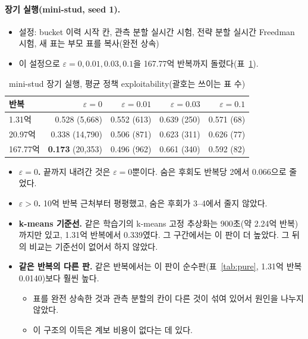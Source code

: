 \paragraph{장기 실행(mini-stud, seed 1).}
\begin{itemize}
  \item 설정: bucket 이력 시작 칸, 관측 분할 실시간 시험, 전략 분할 실시간 Freedman 시험, 새 표는 부모 표를 복사(완전 상속)
  \item 이 설정으로 $\varepsilon=0,0.01,0.03,0.1$을 167.77억 반복까지 돌렸다(표~\ref{tab:longrun}).
\end{itemize}
\begin{table}[h]
\centering\small
\caption{mini-stud 장기 실행, 평균 정책 exploitability(괄호는 쓰이는 표 수)}\label{tab:longrun}
\begin{tabular}{@{}lrrrr@{}}
\toprule
반복 & $\varepsilon=0$ & $\varepsilon=0.01$ & $\varepsilon=0.03$ & $\varepsilon=0.1$ \\
\midrule
1.31억 & 0.528 (5,668) & 0.552 (613) & 0.639 (250) & 0.571 (68) \\
20.97억 & 0.338 (14,790) & 0.506 (871) & 0.623 (311) & 0.626 (77) \\
167.77억 & \textbf{0.173} (20,353) & 0.496 (962) & 0.661 (340) & 0.592 (82) \\
\bottomrule
\end{tabular}
\end{table}
\begin{itemize}
  \item \textbf{$\varepsilon=0$.} 끝까지 내려간 것은 $\varepsilon=0$뿐이다. 숨은 후회도 반복당 2에서 0.066으로 줄었다.
  \item \textbf{$\varepsilon>0$.} 10억 반복 근처부터 평평했고, 숨은 후회가 3–4에서 줄지 않았다.
  \item \textbf{k-means 기준선.} 같은 학습기의 k-means 고정 추상화는 900초(약 2.24억 반복)까지만 있고, 1.31억 반복에서 0.339였다. 그 구간에서는 이 판이 더 높았다. 그 뒤의 비교는 기준선이 없어서 하지 않았다.
  \item \textbf{같은 반복의 다른 판.} 같은 반복에서는 이 판이 순수판(표~\ref{tab:pure}, 1.31억 반복 0.0140)보다 훨씬 높다.
    \begin{itemize}
      \item 표를 완전 상속한 것과 관측 분할의 칸이 다른 것이 섞여 있어서 원인을 나누지 않았다.
      \item 이 구조의 이득은 계보 비용이 없다는 데 있다.
    \end{itemize}
\end{itemize}

